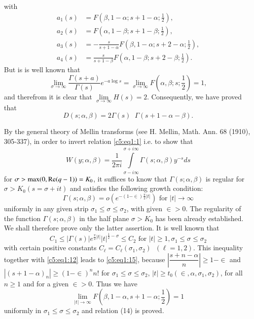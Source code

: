 with 
\begin{align*}
a_1(s) & = F(\beta, 1-\alpha; s+1-\alpha;\frac{1}{2}),\\
a_2(s) & = F(\alpha,1-\beta; s+1-\beta;\frac{1}{2}),\\
a_3(s) & = -\frac{s}{s+1-\alpha} F(\beta,1-\alpha;
s+2-\alpha;\frac{1}{2}),\\
a_4 (s) & = \frac{s}{s+1-\beta} F(\alpha,1-\beta;
s+2-\beta;\frac{1}{2}). 
\end{align*}
But is is well known that 
$$
\lim_{\sigma \to \infty} \frac{\Gamma(s+a)}{\Gamma(s)} e^{-a\log s}
=\lim_{\sigma \to \infty} F(\alpha,\beta; s;\frac{1}{2}) =1,
$$
and therefrom it is clear that
$\lim\limits_{\sigma\to\infty}H(s)=2$. Consequently, we have proved that 
\begin{equation*}
D(s;\alpha,\beta) = 2\Gamma(s) \;\; 
\Gamma (s+1-\alpha-\beta). \tag{13}\label{c5:eq1:13}
\end{equation*}

By the general theory of Mellin transforms (see H. Mellin,
Math. Ann. 68 (1910), 305-337), in order to invert relation \eqref{c5:eq1:1}
i.e. to show that
\begin{equation*}
W(y;\alpha,\beta) =\frac{1}{2\pi i}
\int\limits^{\sigma+i\infty}_{\sigma-i\infty}
\Gamma(s;\alpha,\beta)y^{-s}ds \tag{14}\label{c5:eq1:14}
\end{equation*}
for $\sigma > \max (0,\operatorname{Re}(q-1))=K_0$, it suffices to know that
$\Gamma(s;\alpha,\beta)$ is regular \pageoriginale for
$\sigma>K_0(s=\sigma + it)$ and satisfies the following growth
condition:
\begin{equation*}
\Gamma(s;\alpha,\beta)= o (e^{-(1-\in)\frac{\pi}{2}|t|})
\text{ for } |t| \to \infty \tag{15}\label{c5:eq1:15}
\end{equation*}
uniformly in any given strip $\sigma_1\leq \sigma\leq \sigma_2$, with
given $\in >0$. The regularity of the function
$\Gamma(s;\alpha,\beta)$ in the half plane $\sigma >K_{0}$ has been
already established. We shall therefore prove only the latter
assertion. It is well known that
$$
C_1 \leq |\Gamma(s)|e^{\frac{\pi}{2}|t|} |t|^{\frac{1}{2}-\sigma} \leq
C_2 \text{ for } |t| \geq 1, \sigma_1  \leq \sigma \leq \sigma_2
$$
with certain positive constants
$C_{\ell}=C_{\ell}(\sigma_1,\sigma_2) \;\; (\ell=1,2)$. This inequality
together with \eqref{c5:eq1:12} leads to \eqref{c5:eq1:15}, because
$\left|\dfrac{s+n-\alpha}{n}\right|\geq 
1 -\in$ and $|(s+1-\alpha)_n|\geq (1-\in)^nn!$ for
$\sigma_1 \leq \sigma \leq \sigma_2$, $|t| \geq t_0(\in,
\alpha, \sigma_1, \sigma_2)$, for all $n \geq 1$ and for a given
$\in > 0$. Thus we have 
$$
\lim_{|t|\to \infty} F(\beta, 1-\alpha, s+1-\alpha;\frac{1}{2}) =1
$$
uniformly in $\sigma_1\leq \sigma\leq \sigma_2$ and relation (14) is
proved.

